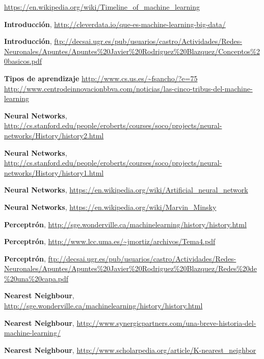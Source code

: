 \documentclass[a4paper, 11pt]{article} %
\begin{document}
\begin{thebibliography}{9}

 \url{https://en.wikipedia.org/wiki/Timeline_of_machine_learning}

 	\textbf{Introducción},
 \url{http://cleverdata.io/que-es-machine-learning-big-data/}

 	\textbf{Introducción},
 \url{ftp://decsai.ugr.es/pub/usuarios/castro/Actividades/Redes-Neuronales/Apuntes/Apuntes%20Javier%20Rodriguez%20Blazquez/Conceptos%20basicos.pdf}

	\textbf{Tipos de aprendizaje}
	\url{http://www.cs.us.es/~fsancho/?e=75}
\url{http://www.centrodeinnovacionbbva.com/noticias/las-cinco-tribus-del-machine-learning}

	\textbf{Neural Networks},
  \url{http://cs.stanford.edu/people/eroberts/courses/soco/projects/neural-networks/History/history2.html}

 	\textbf{Neural Networks},
 \url{http://cs.stanford.edu/people/eroberts/courses/soco/projects/neural-networks/History/history1.html}

 	\textbf{Neural Networks},
 \url{https://en.wikipedia.org/wiki/Artificial_neural_network}

 	\textbf{Neural Networks},
 \url{https://en.wikipedia.org/wiki/Marvin_Minsky}

 	\textbf{Perceptrón},
 \url{http://sge.wonderville.ca/machinelearning/history/history.html}

 	\textbf{Perceptrón},
 \url{http://www.lcc.uma.es/~jmortiz/archivos/Tema4.pdf}

 	\textbf{Perceptrón},
 \url{ftp://decsai.ugr.es/pub/usuarios/castro/Actividades/Redes-Neuronales/Apuntes/Apuntes%20Javier%20Rodriguez%20Blazquez/Redes%20de%20una%20capa.pdf}

 	\textbf{Nearest Neighbour},
 \url{http://sge.wonderville.ca/machinelearning/history/history.html}

 	\textbf{Nearest Neighbour},
 \url{http://www.synergicpartners.com/una-breve-historia-del-machine-learning/}

 	\textbf{Nearest Neighbour},
 \url{http://www.scholarpedia.org/article/K-nearest_neighbor}


\end{thebibliography}
\end{document}
